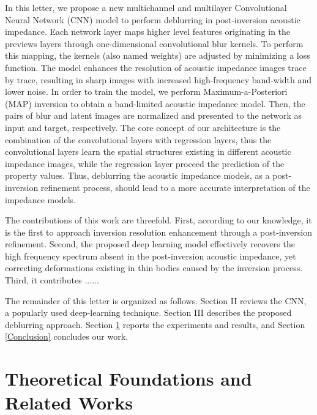 \documentclass[journal]{IEEEtran}
\begin{document}
In this letter, we propose a new multichannel and multilayer
Convolutional Neural Network (CNN) model to perform deblurring
in post-inversion acoustic impedance. Each network layer maps
higher level features originating in the previews layers through
one-dimensional convolutional blur kernels. To perform this
mapping, the kernels (also named weights) are adjusted by
minimizing a loss function. The model enhances the resolution
of acoustic impedance images trace by trace, resulting in sharp
images with increased high-frequency band-width and lower noise.
In order to train the model, we perform Maximum-a-Posteriori (MAP)
inversion to obtain a band-limited acoustic impedance model.
Then, the pairs of blur and latent images are normalized and 
presented to the network as input and target, respectively.
The core concept of our architecture is the combination of the
convolutional layers with regression layers, thus the convolutional
layers learn the spatial structures existing in different acoustic
impedance images, while the regression layer proceed the prediction
of the property values. Thus, deblurring the acoustic impedance
models, as a post-inversion refinement process, should lead to a
more accurate interpretation of the impedance models.

The contributions of this work are threefold. First, according
to our knowledge, it is the first to approach inversion resolution 
enhancement through a post-inversion refinement. Second, the proposed deep
learning model effectively recovers the high frequency spectrum absent
in the post-inversion acoustic impedance, yet correcting deformations existing
in thin bodies caused by the inversion process. Third, it contributes
......

The remainder of this letter is organized as follows. Section II
reviews the CNN, a popularly used deep-learning technique.
Section III describes the proposed deblurring approach.
Section \ref{Theoretics} reports the experiments and results, and Section \ref{Conclusion}
concludes our work.

\section{Theoretical Foundations and Related Works}\label{Theoretics}
\end{document}
